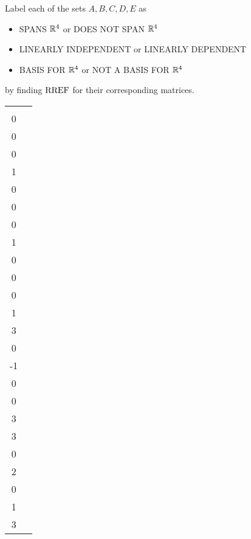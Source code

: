 \begin{activity}{15}
  Label each of the sets \(A,B,C,D,E\) as
  \begin{itemize}
     \item SPANS \(\mathbb{R}^4\) or DOES NOT SPAN \(\mathbb{R}^4\)
     \item LINEARLY INDEPENDENT or LINEARLY DEPENDENT
     \item BASIS FOR \(\mathbb{R}^4\) or NOT A BASIS FOR \(\mathbb{R}^4\)
  \end{itemize}
  by finding \(\operatorname{RREF}\) for their corresponding matrices.
  \begin{center}
    \begin{tabular}{cc}
  	\(A=\left\{
      \begin{bmatrix}1\\0\\0\\0\end{bmatrix},
      \begin{bmatrix}0\\1\\0\\0\end{bmatrix},
      \begin{bmatrix}0\\0\\1\\0\end{bmatrix},
      \begin{bmatrix}0\\0\\0\\1\end{bmatrix}
      \right\}
      \)   &

    \(B=\left\{
      \begin{bmatrix}2\\3\\0\\-1\end{bmatrix},
      \begin{bmatrix}2\\0\\0\\3\end{bmatrix},
      \begin{bmatrix}4\\3\\0\\2\end{bmatrix},
      \begin{bmatrix}-3\\0\\1\\3\end{bmatrix}
      \right\}
      \)  \\



\end{tabular}
\end{center}
\end{activity}
